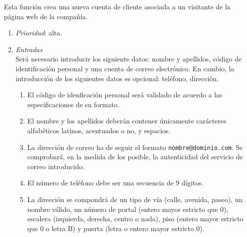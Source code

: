 

 \label{fun:registrarse}
	Esta función crea una nueva cuenta de cliente asociada a un visitante de la página web de la compañía.

	\begin{enumerate}
		\item \textit{Prioridad}: alta.
		\item \textit{Entradas}\\
			Será necesario introducir los siguiente datos: nombre y apellidos, código de identificación personal y una cuenta de correo electrónico. En cambio, la introducción de los siguientes datos es opcional: teléfono, dirección.

			\begin{enumerate}
				\item El código de idenficación personal será validado de acuerdo a las especificaciones de su formato.
				\item El nombre y los apellidos deberán contener únicamente carácteres alfabéticos latinos, acentuados o no, y espacios.
				\item La dirección de correo ha de seguir el formato \verb|nombre@dominio.com|. Se comprobará, en la medida de los posible, la autenticidad del servicio de correo introducido.
				\item El número de teléfono debe ser una secuencia de 9 dígitos. %
				\item La dirección se compondrá de un tipo de vía (calle, avenida, paseo), un nombre válido, un número de portal (entero mayor estricto que 0), escalera (izquierda, derecha, centro o nada), piso (entero mayor estricto que 0 o letra B) y puerta (letra o entero mayor estricto 0).
			\end{enumerate}
		

\end{enumerate}

